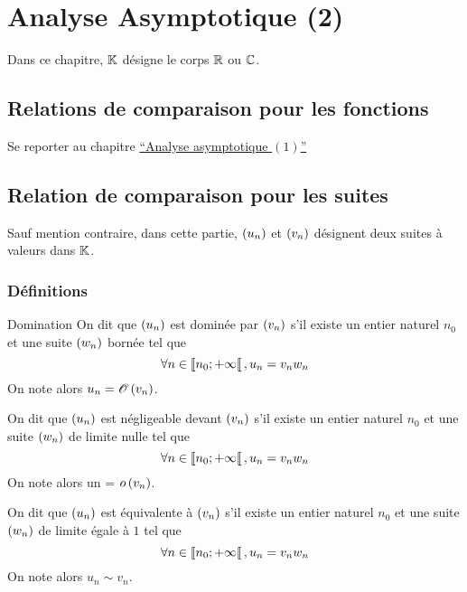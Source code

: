 \chapter{Analyse Asymptotique (2)}

\minitoc

Dans ce chapitre, \(\mathbb{K}\) désigne le corps \(\mathbb{R}\) ou \(\mathbb{C}\).

\section{Relations de comparaison pour les fonctions}
    Se reporter au chapitre \hyperref[chap:analyse-asymptotique1]{“Analyse asymptotique \((1)\)”}
\section{Relation de comparaison pour les suites}
    Sauf mention contraire, dans cette partie, \(\left(u_n\right)\) et \(\left(v_n\right)\) désignent deux suites à valeurs dans \(\mathbb{K}\).
\subsection{Définitions}
\begin{defprop}{Domination}
    On dit que \(\left(u_n\right)\) est dominée par \(\left(v_n\right)\) s’il existe un entier naturel \(n_0\) et une suite \(\left(w_n\right)\) bornée tel que
    \[\forall n \in \left\llbracket n_0;+\infty\right\llbracket , u_n = v_nw_n\]
    On note alors \(u_n = \mathscr{O}\left(v_n\right)\).
\end{defprop}
\begin{defprop}[Négligeabilité]
    On dit que \(\left(u_n\right)\) est négligeable devant \(\left(v_n\right)\) s’il existe un entier naturel \(n_0\) et une suite \(\left(w_n\right)\) de limite nulle tel que
    \[\forall n \in  \left\llbracket n_0;+\infty\right\llbracket   , u_n = v_nw_n\]
    On note alors un = \(o\left(v_n\right)\).  
\end{defprop}
\begin{defprop}[Equivalence]
    On dit que \(\left(u_n\right)\) est équivalente à \(\left(v_n\right)\) s’il existe un entier naturel \(n_0\) et une suite \(\left(w_n\right)\) de limite égale à \(1\) tel que
    \[\forall n \in  \left\llbracket n_0;+\infty\right\llbracket, u_n = v_nw_n\]
    On note alors \(u_n \sim v_n\).
\end{defprop}

